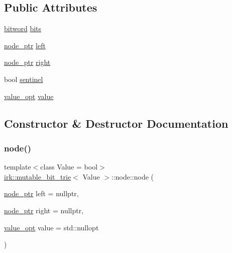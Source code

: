 \subsection*{Public Attributes}
\begin{DoxyCompactItemize}
\item 
\mbox{\hyperlink{namespaceirk_a5d1a67079cf6423ecaededebe848f083}{bitword}} \mbox{\hyperlink{structirk_1_1mutable__bit__trie_1_1node_a8b55d968fa4274a91a6395ea1b9785a8}{bits}}
\item 
\mbox{\hyperlink{classirk_1_1mutable__bit__trie_abd23179ac4f02a981d4f47b4c0652287}{node\+\_\+ptr}} \mbox{\hyperlink{structirk_1_1mutable__bit__trie_1_1node_af59565476fb0ce3e3e3d57edbd8ca1de}{left}}
\item 
\mbox{\hyperlink{classirk_1_1mutable__bit__trie_abd23179ac4f02a981d4f47b4c0652287}{node\+\_\+ptr}} \mbox{\hyperlink{structirk_1_1mutable__bit__trie_1_1node_ad75512c087c6adaf342b9c62fd115f55}{right}}
\item 
bool \mbox{\hyperlink{structirk_1_1mutable__bit__trie_1_1node_a54f76adb0cab3a380ba75cc039065e4d}{sentinel}}
\item 
\mbox{\hyperlink{classirk_1_1mutable__bit__trie_a7a1b77766d10fe2d02bb2ce01983f153}{value\+\_\+opt}} \mbox{\hyperlink{structirk_1_1mutable__bit__trie_1_1node_a1bacc998d6276431578e9ecb8f3dfa59}{value}}
\end{DoxyCompactItemize}


\subsection{Constructor \& Destructor Documentation}
\mbox{\label{structirk_1_1mutable__bit__trie_1_1node_a74037ab76023b8ff9c1cd88f91d06684}} 
\subsubsection{\texorpdfstring{node()}{node()}\hspace{0.1cm}{\footnotesize\ttfamily [1/2]}}
{\footnotesize\ttfamily template$<$class Value = bool$>$ \\
\mbox{\hyperlink{classirk_1_1mutable__bit__trie}{irk\+::mutable\+\_\+bit\+\_\+trie}}$<$ Value $>$\+::node\+::node (\begin{DoxyParamCaption}\item[{\mbox{\hyperlink{classirk_1_1mutable__bit__trie_abd23179ac4f02a981d4f47b4c0652287}{node\+\_\+ptr}}}]{left = {\ttfamily nullptr},  }\item[{\mbox{\hyperlink{classirk_1_1mutable__bit__trie_abd23179ac4f02a981d4f47b4c0652287}{node\+\_\+ptr}}}]{right = {\ttfamily nullptr},  }\item[{\mbox{\hyperlink{classirk_1_1mutable__bit__trie_a7a1b77766d10fe2d02bb2ce01983f153}{value\+\_\+opt}}}]{value = {\ttfamily std\+:\+:nullopt} }\end{DoxyParamCaption})\hspace{0.3cm}{\ttfamily [inline]}}

